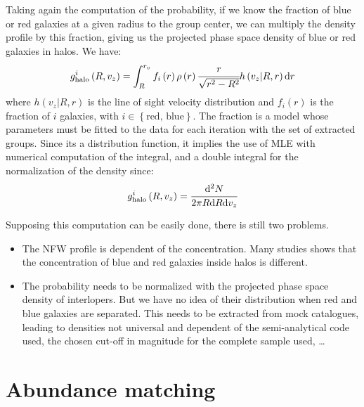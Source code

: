 Taking again the computation of the probability, if we know the fraction of
blue or red galaxies at a given radius to the group center, we can multiply the
density profile by this fraction, giving us the projected phase space density
of blue or red galaxies in halos. We have:
%
\begin{equation}
    g_\mathrm{halo}^i\left(R, v_z\right)=
    \int_R^{r_v} f_i\left(r\right) \rho\left(r\right)
    \cfrac{r}{\sqrt{r^2-R^2}} h\left(v_z|R,r\right) {\rm{d}} r
\end{equation}
%
where $h\left(v_z|R,r\right)$ is the line of sight velocity distribution and
$f_i\left(r\right)$ is the fraction of $i$ galaxies, with
$i\in\left\{\mbox{red, blue}\right\}$. The fraction is a model whose parameters
must be fitted to the data for each iteration with the set of extracted groups.
Since its a distribution function, it implies the use of MLE with numerical
computation of the integral, and a double integral for the normalization of the
density since:
%
\begin{equation}
    g_\mathrm{halo}^i\left(R, v_z\right) = \cfrac{{\rm{d}}^2N}{2\pi R{\rm{d}} R{\rm{d}} v_z}
\end{equation}

Supposing this computation can be easily done, there is still two problems.
%
\begin{itemize}
    \item The NFW profile is dependent of the concentration. Many studies shows
        that the concentration of blue and red galaxies inside halos is
        different. 
    \item The probability needs to be normalized with the projected phase space
        density of interlopers. But we have no idea of their distribution when
        red and blue galaxies are separated. This needs to be extracted from
        mock catalogues, leading to densities not universal and dependent of
        the semi-analytical code used, the chosen cut-off in magnitude for the
        complete sample used, \ldots
\end{itemize}

\section{Abundance matching}
\label{sec:abundance_matching}

